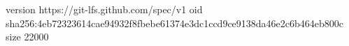 version https://git-lfs.github.com/spec/v1
oid sha256:4eb72323614cae94932f8fbebe61374e3dc1ccd9ce9138da46e2c6b464eb800c
size 22000
